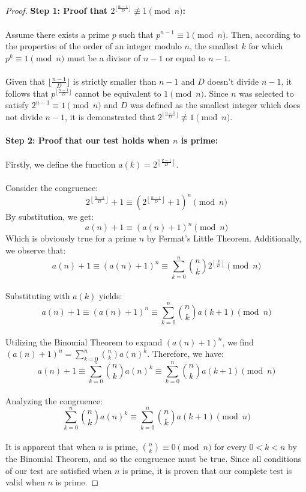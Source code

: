\documentclass{article}
\theoremstyle{plain}
\begin{document}
\begin{proof}
\textbf{Step 1: Proof that $2^{\lfloor\frac{n-1}{D}\rfloor} \not\equiv 1 \pmod{n}$:}
\\
\\
Assume there exists a prime $p$ such that $p^{n-1} \equiv 1 \pmod{n}$. Then, according to the properties of the order of an integer modulo $n$, the smallest $k$ for which $p^k \equiv 1 \pmod{n}$ must be a divisor of $n-1$ or equal to $n-1$.
\\
\\
Given that $\lfloor\frac{n-1}{D}\rfloor$ is strictly smaller than $n-1$ and $D$ doesn't divide $n-1$, it follows that $p^{\lfloor\frac{n-1}{D}\rfloor}$ cannot be equivalent to $1 \pmod{n}$. Since $n$ was selected to satisfy $2^{n-1} \equiv 1 \pmod{n}$ and $D$ was defined as the smallest integer which does not divide $n-1$, it is demonstrated that $2^{\lfloor\frac{n-1}{D}\rfloor} \not\equiv 1 \pmod{n}$.
\\
\\
\textbf{Step 2: Proof that our test holds when $n$ is prime:}
\\
\\
Firstly, we define the function $a(k) = 2^{\left\lfloor \frac{k-1}{D} \right\rfloor}$.
\\
\\
Consider the congruence:
$$2^{\left\lfloor \frac{n-1}{D} \right\rfloor} + 1 \equiv (2^{\left\lfloor \frac{n-1}{D} \right\rfloor} + 1)^{n} \pmod{n}$$
By substitution, we get:
$$a(n) + 1 \equiv (a(n) + 1)^{n} \pmod{n}$$
Which is obviously true for a prime $n$ by Fermat's Little Theorem. Additionally, we observe that:
$$a(n) + 1 \equiv (a(n) + 1)^{n} \equiv \sum_{k=0}^{n} \binom{n}{k}2^{\left\lfloor \frac{k}{D} \right\rfloor} \pmod{n}$$
\\
Substituting with $a(k)$ yields:
$$a(n) + 1 \equiv (a(n) + 1)^{n} \equiv \sum_{k=0}^{n} \binom{n}{k}a(k+1) \pmod{n}$$
\\
Utilizing the Binomial Theorem to expand $(a(n) + 1)^{n}$, we find $(a(n) + 1)^{n} = \sum_{k=0}^{n} \binom{n}{k}a(n)^k$. Therefore, we have:
$$a(n) + 1 \equiv \sum_{k=0}^{n} \binom{n}{k}a(n)^k \equiv \sum_{k=0}^{n} \binom{n}{k}a(k+1) \pmod{n}$$
\\
Analyzing the congruence:
\\
$$\sum_{k=0}^{n} \binom{n}{k}a(n)^k \equiv \sum_{k=0}^{n} \binom{n}{k}a(k+1) \pmod{n}$$
\\
It is apparent that when $n$ is prime, $\binom{n}{k} \equiv 0 \pmod{n}$ for every $0 < k < n$ by the Binomial Theorem, and so the congruence must be true. Since all conditions of our test are satisfied when $n$ is prime, it is proven that our complete test is valid when $n$ is prime.

\end{proof}
\end{document}
